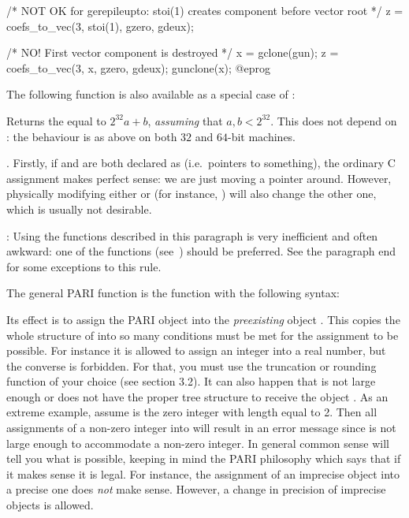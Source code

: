   /* NOT OK for gerepileupto: stoi(1) creates component before vector root */
  z = coefs_to_vec(3, stoi(1), gzero, gdeux);

  /* NO! First vector component is destroyed */
  x = gclone(gun);
  z = coefs_to_vec(3, x, gzero, gdeux);
  gunclone(x);
@eprog

\noindent The following function is also available as a special case of
:


Returns the  equal to $2^{32} a + b$, \emph{assuming} that
$a,b < 2^{32}$. This does not depend on : the behaviour is
as above on both $32$ and $64$-bit machines.

.
Firstly, if  and  are both declared as  (i.e.~pointers
to something), the ordinary C assignment  makes perfect sense: we
are just moving a pointer around. However, physically modifying either
 or  (for instance, ) will also change the other
one, which is usually not desirable. \label{se:assign}

: Using the functions described in this
paragraph is very inefficient and often awkward: one of the 
functions (see~) should be preferred. See the paragraph
end for some exceptions to this rule.

\noindent
The general PARI  function is the function  with
the following syntax:


\noindent
Its effect is to assign the PARI object  into the \emph{preexisting}
object . This copies the whole structure of  into  so
many conditions must be met for the assignment to be possible. For instance
it is allowed to assign an integer into a real number, but the converse is
forbidden.  For that, you must use the truncation or rounding function of
your choice (see section 3.2). It can also happen that  is not large
enough or does not have the proper tree structure to receive the object
. As an extreme example, assume  is the zero integer with length
equal to 2. Then all assignments of a non-zero integer into  will
result in an error message since  is not large enough to accommodate
a non-zero integer.  In general common sense will tell you what is possible,
keeping in mind the PARI philosophy which says that if it makes sense it is
legal. For instance, the assignment of an imprecise object into a precise one
does \emph{not} make sense. However, a change in precision of imprecise
objects is allowed.

